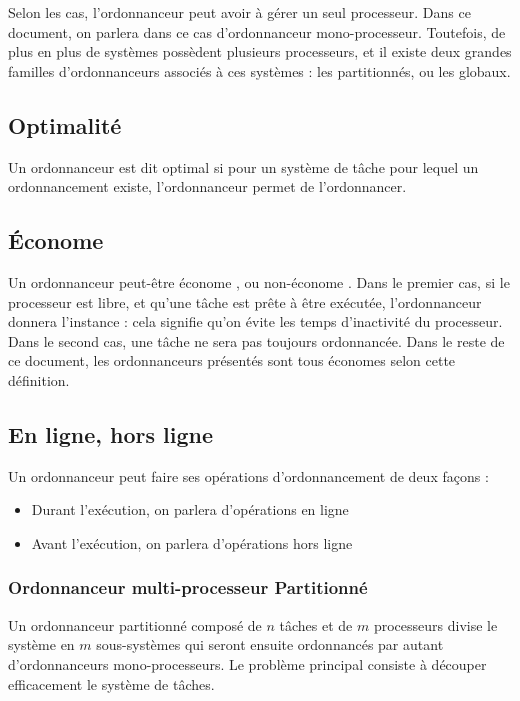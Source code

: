 	Selon les cas, l'ordonnanceur peut avoir à gérer un seul processeur. Dans ce 
	document, on parlera dans ce cas d'ordonnanceur mono-processeur. Toutefois, de plus en 
	plus de systèmes possèdent plusieurs processeurs, et il existe deux grandes familles 
	d'ordonnanceurs associés à ces systèmes : les partitionnés, ou les globaux. \medskip
	
	\subsection{Optimalité}\label{optimal}
	Un ordonnanceur est dit optimal si pour un système de tâche pour lequel un ordonnancement 
	existe, l'ordonnanceur permet de l'ordonnancer.
	
	\subsection{Économe} 
	Un ordonnanceur peut-être \og économe\fg{} , ou \og non-économe\fg{} . Dans le premier cas, si le processeur est libre, 
	et qu'une tâche est prête à être exécutée, l'ordonnanceur donnera l'instance : cela signifie 
	qu'on évite les temps d'inactivité du processeur. Dans le second cas, une tâche ne sera pas toujours ordonnancée.
	Dans le reste de ce document, les ordonnanceurs présentés sont tous économes selon cette définition.
	
	\subsection{En ligne, hors ligne}
	\label{inline}
	Un ordonnanceur peut faire ses opérations d'ordonnancement de deux façons : \medskip
	\begin{itemize}
		\item Durant l'exécution, on parlera d'opérations en ligne
		\item Avant l'exécution, on parlera d'opérations hors ligne
	\end{itemize}	
	
	\subsubsection{Ordonnanceur multi-processeur Partitionné}
	Un ordonnanceur partitionné composé de $n$ tâches et de $m$ processeurs divise 
	le système en $m$ sous-systèmes qui seront ensuite ordonnancés par autant d'ordonnanceurs 
	mono-processeurs. Le problème principal consiste à découper efficacement le système de tâches.
	
